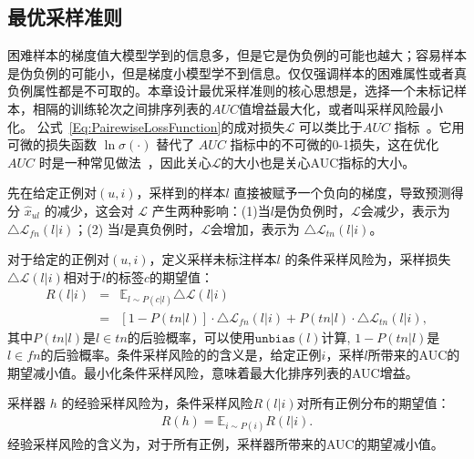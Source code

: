 \subsection{最优采样准则}
困难样本的梯度值大模型学到的信息多，但是它是伪负例的可能也越大；容易样本是伪负例的可能小，但是梯度小模型学不到信息。仅仅强调样本的困难属性或者真负例属性都是不可取的。本章设计最优采样准则的核心思想是，选择一个未标记样本，相隔的训练轮次之间排序列表的$AUC$值增益最大化，或者叫采样风险最小化。
公式~\eqref{Eq:PairewiseLossFunction}的成对损失$\mathcal{L}$ 可以类比于$AUC$ 指标~\cite{Steffen:2009:UAI}。它用可微的损失函数 $\ln \sigma(\cdot)$ 替代了 $AUC$ 指标中的不可微的0-1损失，这在优化 $AUC$ 时是一种常见做法~\cite{Herschtal:2004:ICML,Steffen:2009:UAI}，因此关心$\mathcal{L}$的大小也是关心AUC指标的大小。

先在给定正例对$(u,i)$，采样到的样本$l$ 直接被赋予一个负向的梯度，导致预测得分 $\hat{x}_{ul}$ 的减少，这会对 $\mathcal{L}$ 产生两种影响：(1)当$l$是伪负例时，$\mathcal{L}$会减少，表示为 $\triangle \mathcal{L}_{fn}(l|i)$；(2) 当$l$是真负例时，$\mathcal{L}$会增加，表示为 $\triangle \mathcal{L}_{tn}(l|i)$。

\begin{definition}[条件采样风险]
对于给定的正例对$(u,i)$，定义采样未标注样本$l$ 的条件采样风险为，采样损失$\triangle \mathcal{L}(l|i)$相对于$l$的标签$c$的期望值：
	\begin{eqnarray}
		R(l|i) 
		&=&  \mathbb{E}_{l \sim P(c|l)}  \triangle \mathcal{L}(l|i)\nonumber\\
		&=&[1- P(tn|l)] \cdot \triangle \mathcal{L}_{fn}(l|i) + P(tn|l)\cdot \triangle \mathcal{L}_{tn}(l|i)\label{eq:condirisk},
	\end{eqnarray}
其中$P(tn|l)$是$l\in tn$的后验概率，可以使用$\mathtt{unbias}(l)$计算, $ 1 - P(tn|l)$是$l\in fn$的后验概率。条件采样风险的的含义是，给定正例$i$，采样$l$所带来的AUC的期望减小值。最小化条件采样风险，意味着最大化排序列表的AUC增益。
\end{definition}

\begin{definition}[经验采样风险]
采样器 $h$ 的经验采样风险为，条件采样风险$R(l|i)$对所有正例分布的期望值：
	\begin{eqnarray}
		R(h) = \mathbb{E}_{i \sim P(i)} R(l|i).
	\end{eqnarray}
经验采样风险的含义为，对于所有正例，采样器所带来的AUC的期望减小值。
\end{definition}

